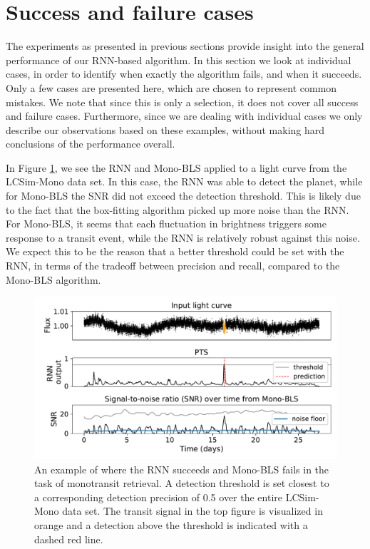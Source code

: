 
\section{Success and failure cases}
\label{sec:cases}

The experiments as presented in previous sections provide insight into the general performance of our RNN-\nobreak{}based algorithm. In this section we look at individual cases, in order to identify when exactly the algorithm fails, and when it succeeds. Only a few cases are presented here, which are chosen to represent common mistakes. We note that since this is only a selection, it does not cover all success and failure cases. Furthermore, since we are dealing with individual cases we only describe our observations based on these examples, without making hard conclusions of the performance overall.

In Figure \ref{fig:sf_mono_rnn_not_bls}, we see the RNN and Mono-BLS applied to a light curve from the LCSim-Mono data set. In this case, the RNN was able to detect the planet, while for Mono-BLS the SNR did not exceed the detection threshold. This is likely due to the fact that the box-fitting algorithm picked up more noise than the RNN. For Mono-BLS, it seems that each fluctuation in brightness triggers some response to a transit event, while the RNN is relatively robust against this noise. We expect this to be the reason that a better threshold could be set with the RNN, in terms of the tradeoff between precision and recall, compared to the Mono-BLS algorithm.

\begin{figure}
    \centering
    \includegraphics[width=0.65\linewidth]{Experiments/Figures/Cases/sf_mono_rnn_not_bls_3.pdf}
    \caption{An example of where the RNN succeeds and Mono-BLS fails in the task of monotransit retrieval. A detection threshold is set closest to a corresponding detection precision of 0.5 over the entire LCSim-Mono data set. The transit signal in the top figure is visualized in orange and a detection above the threshold is indicated with a dashed red line.}
    \label{fig:sf_mono_rnn_not_bls}
\end{figure}

